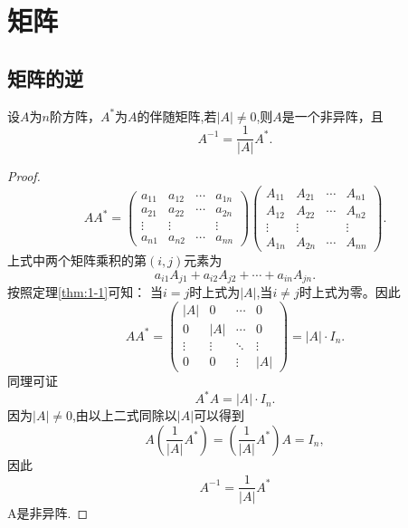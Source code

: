 \section{矩阵}

\subsection{矩阵的逆}\label{thm:2.1}
\begin{theorem}
设$A$为$n$阶方阵，$A^*$为$A$的伴随矩阵,若$|A| \neq 0$,则$A$是一个非异阵，且
  \begin{equation}
  A^{-1}=\frac{1}{|A|}A^*.
\end{equation}

\end{theorem}

\begin{proof}
  \begin{equation*}
    AA^*=
    \begin{pmatrix}
      a_{11} & a_{12} & \cdots & a_{1n}\\
      a_{21} & a_{22} & \cdots & a_{2n}\\
      \vdots & \vdots & & \vdots\\
      a_{n1} & a_{n2} & \cdots & a_{nn}
    \end{pmatrix}
    \begin{pmatrix}
      A_{11} & A_{21} & \cdots & A_{n1}\\
      A_{12} & A_{22} & \cdots & A_{n2}\\
      \vdots & \vdots & & \vdots\\
      A_{1n} & A_{2n} & \cdots & A_{nn}
    \end{pmatrix}.
    \end{equation*}
    上式中两个矩阵乘积的第$(i,j)$元素为
    \begin{equation*}
      a_{i1}A_{j1}+a_{i2}A_{j2}+\cdots+a_{in}A_{jn}.
    \end{equation*}
    按照定理\eqref{thm:1-1}可知：
    当$i=j$时上式为$|A|$,当$i \neq j$时上式为零。因此
    \begin{equation*}
      AA^*=
      \begin{pmatrix}
        |A| & 0 & \cdots & 0\\
        0 & |A| & \cdots & 0\\
        \vdots & \vdots & \ddots & \vdots\\
        0 & 0 & \vdots & |A|
      \end{pmatrix}=|A|\cdot I_n.
    \end{equation*}
同理可证
\begin{equation*}
  A^*A=|A|\cdot I_n.
\end{equation*}
因为$|A|\neq 0$,由以上二式同除以$|A|$可以得到
\begin{equation*}
  A(\frac{1}{|A|}A^*)=(\frac{1}{|A|}A^*)A=I_n,
\end{equation*}
因此
\begin{equation*}
  A^{-1}=\frac{1}{|A|}A^*
\end{equation*}
A是非异阵.
\end{proof}

